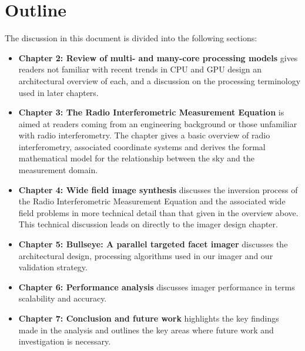 \section{Outline}
The discussion in this document is divided into the following sections:
\begin{itemize}
 \item \textbf{Chapter 2: Review of multi- and many-core processing models} gives readers not familiar with recent trends in CPU and GPU design an architectural overview of each, and a discussion
 on the processing terminology used in later chapters. 
 \item \textbf{Chapter 3: The Radio Interferometric Measurement Equation} is aimed at readers coming from an engineering background or those unfamiliar with radio interferometry. The chapter 
 gives a basic overview of radio interferometry, associated coordinate systems and derives the formal mathematical model for the relationship between the sky and the measurement domain.
 \item \textbf{Chapter 4: Wide field image synthesis} discusses the inversion process of the Radio Interferometric Measurement Equation and the associated wide field problems 
 in more technical detail than that given in the overview above. This technical discussion leads on directly to the imager design chapter.
 \item \textbf{Chapter 5: Bullseye: A parallel targeted facet imager} discusses the architectural design, processing algorithms used in our imager and our validation strategy.
 \item \textbf{Chapter 6: Performance analysis} discusses imager performance in terms scalability and accuracy.
 \item \textbf{Chapter 7: Conclusion and future work} highlights the key findings made in the analysis and outlines the key areas where future work and investigation is necessary.
\end{itemize}
